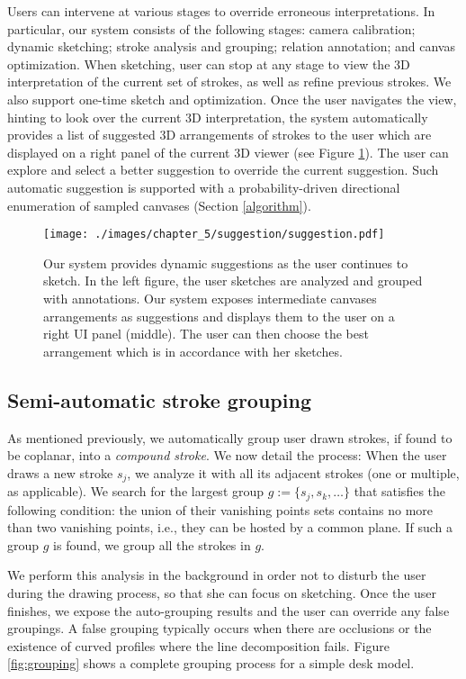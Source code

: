 Users can intervene at various stages to override erroneous interpretations. In particular, our system consists of the following stages: camera calibration; dynamic sketching; stroke analysis and grouping; relation annotation; and canvas optimization. When sketching, user can stop at any stage to view the 3{D} interpretation of the current set of strokes, as well as refine previous strokes. We also support one-time sketch and optimization. Once the user navigates the view, hinting to look over the current 3D interpretation, the system automatically provides a list of suggested 3{D} arrangements of strokes to the user which are displayed on a right panel of the current 3{D} viewer (see Figure \ref{fig:suggestion}). The user can explore and select a better suggestion to override the current suggestion. Such automatic suggestion is supported with a probability-driven directional enumeration of sampled canvases (Section \ref{algorithm}).

\begin{figure}[t!]
  \texttt{[image: ./images/chapter\_5/suggestion/suggestion.pdf]}
  \caption[System interface.]{Our system provides dynamic suggestions as the user continues to sketch. In the left figure, the user sketches are analyzed and grouped with annotations. Our system exposes intermediate canvases arrangements as suggestions and displays them to the user on a right UI panel (middle). The user can then choose the best arrangement which is in accordance with her sketches.}
  \label{fig:suggestion}
\end{figure}


\subsection{Semi-automatic stroke grouping}

As mentioned previously, we automatically group user drawn strokes, if found to be coplanar, into a \emph{compound stroke}. We now detail the process: When the user draws a new stroke $s_j$, we analyze it with all its adjacent strokes (one or multiple, as applicable). We search for the largest group $g := \{s_j, s_k, \dots\}$ that satisfies the following condition: the union of their vanishing points sets contains no more than two vanishing points, i.e., they can be hosted by a common plane. If such a group $g$ is found, we group all the strokes in $g$.

We perform this analysis in the background in order not to disturb the user during the drawing process, so that she can focus on sketching. Once the user finishes, we expose the auto-grouping results and the user can override any false groupings. A false grouping typically occurs when there are occlusions or the existence of curved profiles where the line decomposition fails. Figure \ref{fig:grouping} shows a complete grouping process for a simple desk model.

